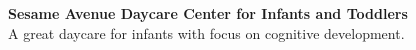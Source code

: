{\textbf{Sesame Avenue Daycare Center for Infants and Toddlers}}\\
A great daycare for infants with focus on cognitive development.\\
\vspace*{2mm}